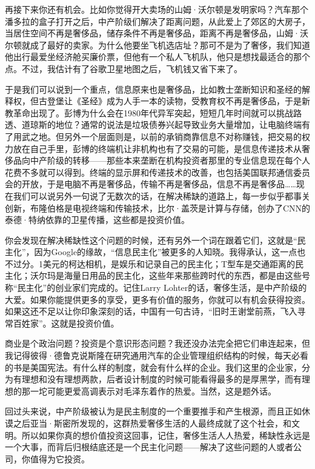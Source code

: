 再接下来你还有机会。比如你觉得开大卖场的山姆·沃尔顿是发明家吗？汽车那个潘多拉的盒子打开之后，中产阶级们解决了距离问题，从此爱上了郊区的大房子，当居住空间不再是奢侈品，储存条件不再是奢侈品，距离不再是奢侈品，山姆·沃尔顿就成了最好的卖家。为什么他要坐飞机选店址？那可不是为了奢侈，我们知道他出行最爱坐经济舱买廉价票，但他有一个私人飞机队，他只是想找最适合的那个点。不过，我估计有了谷歌卫星地图之后，飞机钱又省下来了。

于是我们可以说到一个重点，信息原来也是奢侈品，比如教士垄断知识和圣经的解释权，但古登堡让《圣经》成为人手一本的读物，受教育权不再是奢侈品，于是新教革命出现了。彭博为什么会在1980年代异军突起，短短几年时间就可以挑战路透、道琼斯的地位？通常的说法是垃圾债券兴起导致业务大量增加，让电脑终端有了用武之地。但另外一个层面则是，以前的承销商靠信息不对称赚钱，把交易的权力放在自己手里，彭博的终端机让非机构也有了交易的可能，是信息传递技术从奢侈品向中产阶级的转移------那些本来垄断在机构投资者那里的专业信息现在每个人花费不多就可以得到。终端的显示屏和传递技术的改善，也包括美国联邦通信委员会的开放，于是电脑不再是奢侈品，传输不再是奢侈品，信息不再是奢侈品\ldots{}\ldots{}现在我们可以说另外一句说了无数次的话，在解决稀缺的道路上，每一步似乎都事关创新，布隆伯格是电视终端和传输技术，比尔·盖茨是计算与存储，创办了CNN的泰德·特纳依靠的卫星传播，这些都是投资价值。

你会发现在解决稀缺性这个问题的时候，还有另外一个词在跟着它们，这就是``民主化''，因为Google的缘故，``信息民主化''被更多的人知晓。我得承认，这一点也不过分。1美元的柯达相机，是娱乐和记录自己的民主化；T型车是交通距离的民主化；沃尔玛是海量日用品的民主化，这些年来那些跨时代的东西，都是由这些号称``民主化''的创业家们完成的。记住Larry
Lohter的话，奢侈生活，是中产阶级的大爱。如果你能提供更多的享受，更多有价值的服务，你就可以有机会获得投资。如果这还不足以让你印象深刻的话，中国有一句古诗，``旧时王谢堂前燕，飞入寻常百姓家''。这就是投资价值。

商业是个政治问题？投资是个意识形态问题？我还没办法完全把它们串连起来，但我记得彼得·德鲁克说斯隆在研究通用汽车的企业管理组织结构的时候，每天必看的书是美国宪法。有什么样的制度，就会有什么样的企业。我们这里的企业家，分为有理想和没有理想两款，后者设计制度的时候可能看得最多的是厚黑学，而有理想的那一坨可能更爱高调表示对毛泽东着作的热爱。当然，这是题外话。

回过头来说，中产阶级被认为是民主制度的一个重要推手和产生根源，而且正如休谟之后亚当·斯密所发现的，这群热爱奢侈生活的人最终成就了这个社会，和文明。所以如果你真的想价值投资这回事，记住，奢侈生活人人热爱，稀缺性永远是一个大事，而背后归根结底还是一个民主化问题------解决了这些问题的人或者公司，你值得为它投资。

